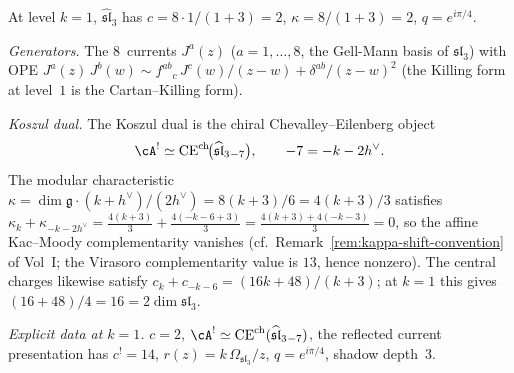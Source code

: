 \begin{computation}[Affine $\widehat{\mathfrak{sl}}_3$ at $k=1$:
explicit holographic quantisation; \ClaimStatusProvedHere]
At level $k=1$, $\widehat{\mathfrak{sl}}_3$ has
$c=8\cdot 1/(1+3)=2$,
$\kappa=8/(1+3)=2$,
$q=e^{i\pi/4}$.

\emph{Generators.}
The $8$~currents $J^a(z)$ ($a=1,\dots,8$, the Gell-Mann
basis of $\mathfrak{sl}_3$) with OPE
$J^a(z)\,J^b(w)\sim
f^{ab}{}_c\,J^c(w)/(z-w)
+\delta^{ab}/(z-w)^2$
(the Killing form at level~$1$ is the Cartan--Killing form).

\emph{Koszul dual.}
The Koszul dual is the chiral Chevalley--Eilenberg object
\[
\cA^!\simeq
\CE^{\mathrm{ch}}\!\bigl(\widehat{\mathfrak{sl}}_3{}_{-7}\bigr),
\qquad -7=-k-2h^\vee.
\]
The modular characteristic $\kappa=\dim\mathfrak g\cdot(k+h^\vee)/(2h^\vee)
=8(k+3)/6=4(k+3)/3$ satisfies
$\kappa_k+\kappa_{-k-2h^\vee}
=\frac{4(k+3)}{3}+\frac{4(-k-6+3)}{3}
=\frac{4(k+3)+4(-k-3)}{3}
=0$,
so the affine Kac--Moody complementarity vanishes
(cf.\ Remark~\ref*{rem:kappa-shift-convention}
of Vol~I; the Virasoro complementarity value is $13$, hence
nonzero). The central charges likewise satisfy
$c_k+c_{-k-6}=(16k+48)/(k+3)$; at $k=1$ this gives
$(16+48)/4=16=2\dim\mathfrak{sl}_3$.

\emph{Explicit data at $k=1$.}
$c=2$,
$\cA^!\simeq\CE^{\mathrm{ch}}(\widehat{\mathfrak{sl}}_3{}_{-7})$,
the reflected current presentation has $c^!=14$,
$r(z)=k\,\Omega_{\mathfrak{sl}_3}/z$,
$q=e^{i\pi/4}$, shadow depth~$3$.
\end{computation}

